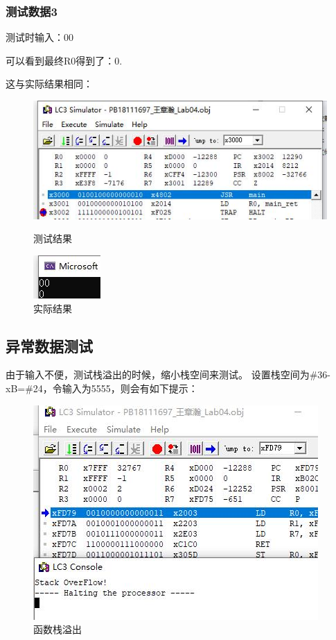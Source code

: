 \documentclass[UTF8]{article}
\begin{document}
\subsubsection{测试数据3}
测试时输入：00\par
可以看到最终R0得到了：0.\par
这与实际结果相同：
\begin{figure}[H]
\begin{minipage}[H]{0.48\linewidth}
	\centering
	\includegraphics[scale=0.45]{test3.jpg}
	\caption{测试结果}
	\label{test3}
\end{minipage}
\qquad
\begin{minipage}[H]{0.48\linewidth}
	\centering
	\includegraphics[scale=1]{test3_a.jpg}
	\caption{实际结果}
	\label{test3_a}
\end{minipage}
\end{figure}
\subsection{异常数据测试}
由于输入不便，测试栈溢出的时候，缩小栈空间来测试。
设置栈空间为\#36-xB=\#24，令输入为5555，则会有如下提示：\par
\begin{figure}[H]
	\centering
	\includegraphics[scale=0.5]{sof.jpg}
	\caption{函数栈溢出}
	\label{sof}
\end{figure}\par
\end{document}
